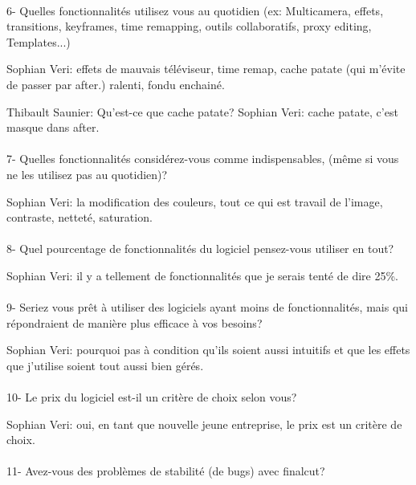 \paragraph{}
6-  Quelles fonctionnalités utilisez vous au quotidien (ex: Multicamera, effets,
transitions, keyframes, time remapping, outils collaboratifs, proxy
editing, Templates...)

Sophian Veri: effets de mauvais téléviseur, time remap, cache patate (qui m'évite
de passer par after.) ralenti, fondu enchainé.

Thibault Saunier: Qu'est-ce que cache patate?
Sophian Veri: cache patate, c'est masque dans after.

\paragraph{}
7-  Quelles fonctionnalités considérez-vous comme indispensables, (même si vous
ne les utilisez pas au quotidien)?

Sophian Veri: la modification des couleurs,  tout ce qui est travail de
l'image, contraste, netteté, saturation.

\paragraph{}
8- Quel pourcentage de fonctionnalités du logiciel pensez-vous utiliser
en tout?

Sophian Veri: il y a  tellement de fonctionnalités que je serais tenté
de dire 25\%.

\paragraph{}
9- Seriez vous prêt à utiliser des logiciels ayant moins de fonctionnalités,
mais qui répondraient de manière plus efficace à vos besoins?

Sophian Veri: pourquoi pas à condition qu'ils soient aussi intuitifs et que les effets
que j'utilise soient tout aussi bien gérés.

\paragraph{}
10-  Le prix du logiciel est-il un critère de choix selon vous?

Sophian Veri: oui, en tant que nouvelle jeune entreprise, le prix est
un critère de choix.

\paragraph{}
11- Avez-vous des problèmes de stabilité (de bugs) avec finalcut?


